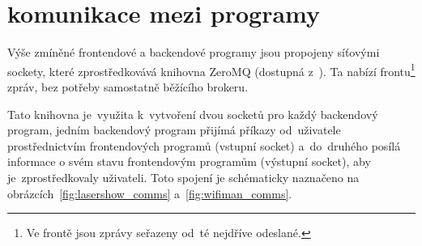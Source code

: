 \section{komunikace mezi programy}\label{sec:comms}
Výše zmíněné frontendové a backendové programy jsou propojeny síťovými sockety, které zprostředkovává knihovna ZeroMQ (dostupná z~\cite{zeromq}). Ta nabízí frontu\footnote{Ve frontě jsou zprávy seřazeny od~té nejdříve odeslané.} zpráv, bez potřeby samostatně běžícího brokeru.

Tato knihovna je~využita k~vytvoření dvou socketů pro každý backendový program, jedním backendový program přijímá příkazy od~uživatele prostřednictvím frontendových programů (vstupní socket) a~do~druhého posílá informace o svém stavu frontendovým programům (výstupní socket), aby je~zprostředkovaly uživateli. Toto spojení je schématicky naznačeno na obrázcích~\ref{fig:lasershow_comms} a~\ref{fig:wifiman_comms}.

